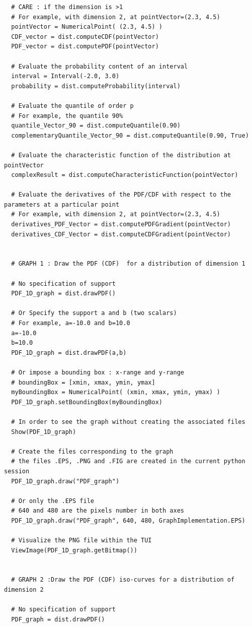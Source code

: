 \begin{lstlisting}
  # CARE : if the dimension is >1
  # For example, with dimension 2, at pointVector=(2.3, 4.5)
  pointVector = NumericalPoint( (2.3, 4.5) )
  CDF_vector = dist.computeCDF(pointVector)
  PDF_vector = dist.computePDF(pointVector)

  # Evaluate the probability content of an interval
  interval = Interval(-2.0, 3.0)
  probability = dist.computeProbability(interval)

  # Evaluate the quantile of order p
  # For example, the quantile 90%
  quantile_Vector_90 = dist.computeQuantile(0.90)
  complementaryQuantile_Vector_90 = dist.computeQuantile(0.90, True)

  # Evaluate the characteristic function of the distribution at pointVector
  complexResult = dist.computeCharacteristicFunction(pointVector)

  # Evaluate the derivatives of the PDF/CDF with respect to the parameters at a particular point
  # For example, with dimension 2, at pointVector=(2.3, 4.5)
  derivatives_PDF_Vector = dist.computePDFGradient(pointVector)
  derivatives_CDF_Vector = dist.computeCDFGradient(pointVector)


  # GRAPH 1 : Draw the PDF (CDF)  for a distribution of dimension 1

  # No specification of support
  PDF_1D_graph = dist.drawPDF()

  # Or Specify the support a and b (two scalars)
  # For example, a=-10.0 and b=10.0
  a=-10.0
  b=10.0
  PDF_1D_graph = dist.drawPDF(a,b)

  # Or impose a bounding box : x-range and y-range
  # boundingBox = [xmin, xmax, ymin, ymax]
  myBoundingBox = NumericalPoint( (xmin, xmax, ymin, ymax) )
  PDF_1D_graph.setBoundingBox(myBoundingBox)

  # In order to see the graph without creating the associated files
  Show(PDF_1D_graph)

  # Create the files corresponding to the graph
  # the files .EPS, .PNG and .FIG are created in the current python session
  PDF_1D_graph.draw("PDF_graph")

  # Or only the .EPS file
  # 640 and 480 are the pixels number in both axes
  PDF_1D_graph.draw("PDF_graph", 640, 480, GraphImplementation.EPS)

  # Visualize the PNG file within the TUI
  ViewImage(PDF_1D_graph.getBitmap())


  # GRAPH 2 :Draw the PDF (CDF) iso-curves for a distribution of dimension 2

  # No specification of support
  PDF_graph = dist.drawPDF()


\end{lstlisting}
